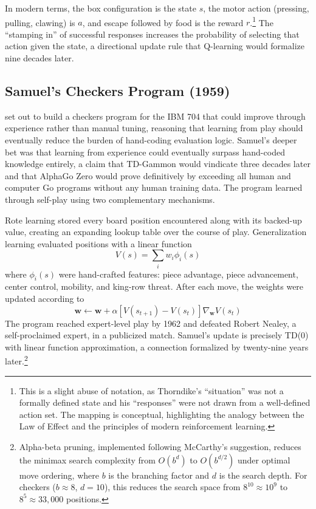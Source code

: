 In modern terms, the box configuration is the state $s$, the motor action (pressing, pulling, clawing) is $a$, and escape followed by food is the reward $r$.\footnote{This is a slight abuse of notation, as Thorndike's ``situation'' was not a formally defined state and his ``responses'' were not drawn from a well-defined action set. The mapping is conceptual, highlighting the analogy between the Law of Effect and the principles of modern reinforcement learning.} The ``stamping in'' of successful responses increases the probability of selecting that action given the state, a directional update rule that Q-learning would formalize nine decades later.

\subsection{Samuel's Checkers Program (1959)}

\citet{Samuel1959} set out to build a checkers program for the IBM 704 that could improve through experience rather than manual tuning, reasoning that learning from play should eventually reduce the burden of hand-coding evaluation logic. Samuel's deeper bet was that learning from experience could eventually surpass hand-coded knowledge entirely, a claim that TD-Gammon would vindicate three decades later and that AlphaGo Zero would prove definitively by exceeding all human and computer Go programs without any human training data. The program learned through self-play using two complementary mechanisms.

Rote learning stored every board position encountered along with its backed-up value, creating an expanding lookup table over the course of play. Generalization learning evaluated positions with a linear function
\begin{equation}
V(s) = \sum_{i} w_i \phi_i(s)
\end{equation}
where $\phi_i(s)$ were hand-crafted features: piece advantage, piece advancement, center control, mobility, and king-row threat. After each move, the weights were updated according to
\begin{equation}
\mathbf{w} \leftarrow \mathbf{w} + \alpha \left[ V(s_{t+1}) - V(s_t) \right] \nabla_{\mathbf{w}} V(s_t)
\end{equation}
The program reached expert-level play by 1962 and defeated Robert Nealey, a self-proclaimed expert, in a publicized match. Samuel's update is precisely TD(0) with linear function approximation, a connection formalized by \citet{sutton1988} twenty-nine years later.\footnote{Alpha-beta pruning, implemented following McCarthy's suggestion, reduces the minimax search complexity from $O(b^d)$ to $O(b^{d/2})$ under optimal move ordering, where $b$ is the branching factor and $d$ is the search depth. For checkers ($b \approx 8$, $d = 10$), this reduces the search space from $8^{10} \approx 10^9$ to $8^5 \approx 33{,}000$ positions.}


